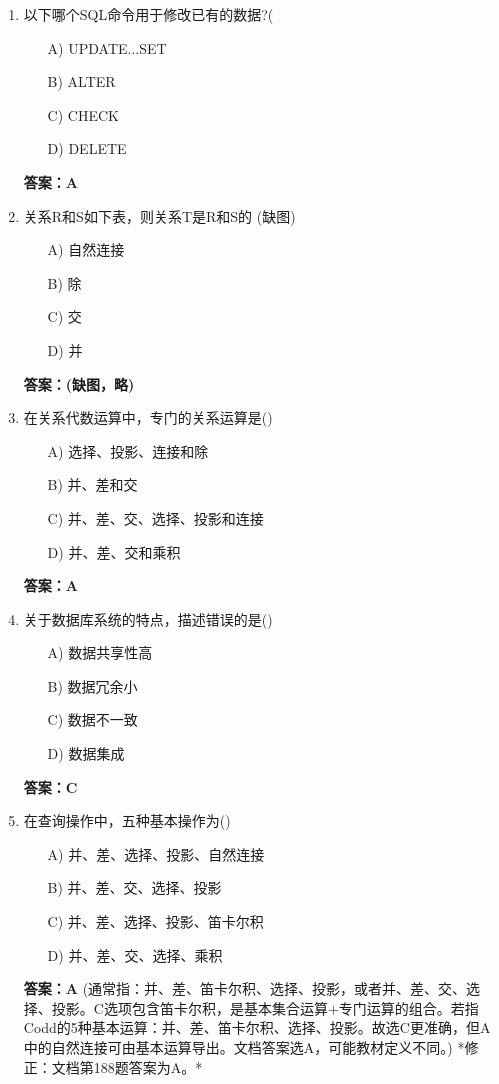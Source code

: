 \documentclass[a4paper,12pt]{article}
\begin{document}
\begin{enumerate}[label=\arabic*.]
\item 以下哪个SQL命令用于修改已有的数据?(
\begin{itemize}
    \item[A)] UPDATE...SET
    \item[B)] ALTER
    \item[C)] CHECK
    \item[D)] DELETE
\end{itemize}
\textbf{答案：A}

\item 关系R和S如下表，则关系T是R和S的 (缺图)
\begin{itemize}
    \item[A)] 自然连接
    \item[B)] 除
    \item[C)] 交
    \item[D)] 并
\end{itemize}
\textbf{答案：(缺图，略)}

\item 在关系代数运算中，专门的关系运算是()
\begin{itemize}
    \item[A)] 选择、投影、连接和除
    \item[B)] 并、差和交
    \item[C)] 并、差、交、选择、投影和连接
    \item[D)] 并、差、交和乘积
\end{itemize}
\textbf{答案：A}

\item 关于数据库系统的特点，描述错误的是()
\begin{itemize}
    \item[A)] 数据共享性高
    \item[B)] 数据冗余小
    \item[C)] 数据不一致
    \item[D)] 数据集成
\end{itemize}
\textbf{答案：C}

\item 在查询操作中，五种基本操作为()
\begin{itemize}
    \item[A)] 并、差、选择、投影、自然连接
    \item[B)] 并、差、交、选择、投影
    \item[C)] 并、差、选择、投影、笛卡尔积
    \item[D)] 并、差、交、选择、乘积
\end{itemize}
\textbf{答案：A} (通常指：并、差、笛卡尔积、选择、投影，或者并、差、交、选择、投影。C选项包含笛卡尔积，是基本集合运算+专门运算的组合。若指Codd的5种基本运算：并、差、笛卡尔积、选择、投影。故选C更准确，但A中的自然连接可由基本运算导出。文档答案选A，可能教材定义不同。) *修正：文档第188题答案为A。*


\end{enumerate}
\end{document}
